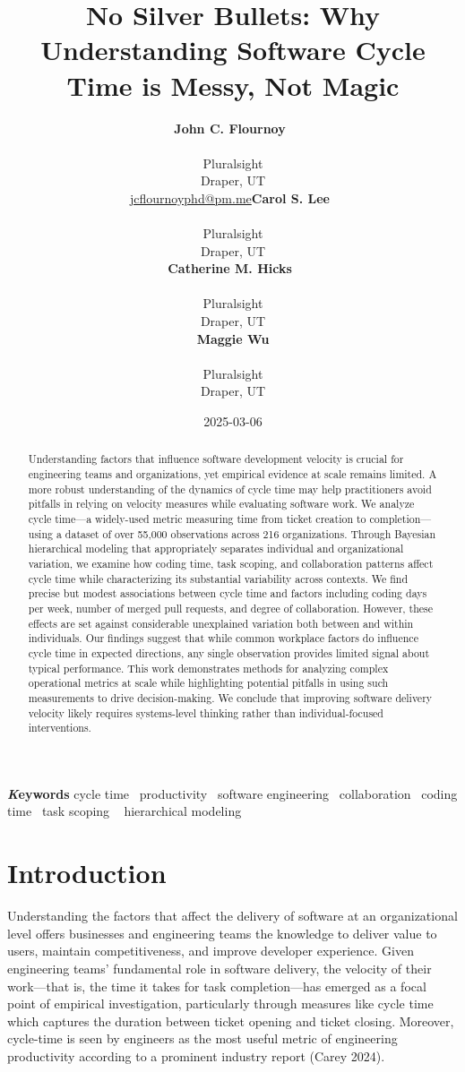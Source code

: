 \documentclass[
]{article}
\title{No Silver Bullets: Why Understanding Software Cycle Time is
Messy, Not Magic}
\author{\textbf{John C.
Flournoy}~\orcidlink{0000-0003-1735-1221}\\\\Pluralsight\\Draper,
UT\\\href{mailto:jcflournoyphd@pm.me}{jcflournoyphd@pm.me}\asep\textbf{Carol
S. Lee}~\orcidlink{0000-0002-6909-6157}\\\\Pluralsight\\Draper,
UT\\\asep\textbf{Catherine M.
Hicks}~\orcidlink{0009-0007-5657-1661}\\\\Pluralsight\\Draper,
UT\\\asep\textbf{Maggie Wu}\\\\Pluralsight\\Draper, UT\\}
\date{2025-03-06}
\begin{document}
\maketitle
\begin{abstract}
Understanding factors that influence software development velocity is
crucial for engineering teams and organizations, yet empirical evidence
at scale remains limited. A more robust understanding of the dynamics of
cycle time may help practitioners avoid pitfalls in relying on velocity
measures while evaluating software work. We analyze cycle time---a
widely-used metric measuring time from ticket creation to
completion---using a dataset of over 55,000 observations across 216
organizations. Through Bayesian hierarchical modeling that appropriately
separates individual and organizational variation, we examine how coding
time, task scoping, and collaboration patterns affect cycle time while
characterizing its substantial variability across contexts. We find
precise but modest associations between cycle time and factors including
coding days per week, number of merged pull requests, and degree of
collaboration. However, these effects are set against considerable
unexplained variation both between and within individuals. Our findings
suggest that while common workplace factors do influence cycle time in
expected directions, any single observation provides limited signal
about typical performance. This work demonstrates methods for analyzing
complex operational metrics at scale while highlighting potential
pitfalls in using such measurements to drive decision-making. We
conclude that improving software delivery velocity likely requires
systems-level thinking rather than individual-focused interventions.
\end{abstract}
{\bfseries \emph Keywords}
\def\sep{\textbullet\ }
cycle time \sep productivity \sep software
engineering \sep collaboration \sep coding time \sep task scoping \sep 
hierarchical modeling



\section{Introduction}\label{introduction}

Understanding the factors that affect the delivery of software at an
organizational level offers businesses and engineering teams the
knowledge to deliver value to users, maintain competitiveness, and
improve developer experience. Given engineering teams' fundamental role
in software delivery, the velocity of their work---that is, the time it
takes for task completion---has emerged as a focal point of empirical
investigation, particularly through measures like cycle time which
captures the duration between ticket opening and ticket closing.
Moreover, cycle-time is seen by engineers as the most useful metric of
engineering productivity according to a prominent industry report (Carey
2024).
\end{document}
